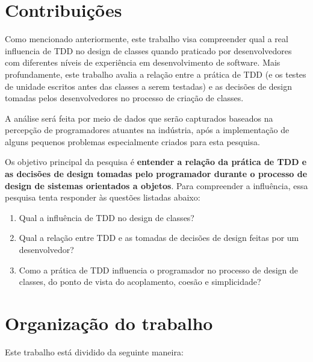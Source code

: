 \section{Contribuições}

Como mencionado anteriormente, este trabalho
visa compreender qual a real influencia de TDD no design de classes quando praticado
por desenvolvedores com diferentes níveis de experiência em desenvolvimento de 
software.
Mais profundamente, este trabalho avalia a relação entre a prática de TDD (e os testes de unidade
escritos antes das classes a serem testadas) e as decisões de design tomadas 
pelos desenvolvedores no processo de criação de classes.

A análise será feita por meio de dados que serão
capturados baseados na percepção de programadores atuantes na indústria, após
a implementação de alguns pequenos problemas especialmente criados para
esta pesquisa.

Os objetivo principal da pesquisa é \textbf{entender a relação da prática de TDD 
e as decisões de design tomadas pelo programador durante o processo de design de sistemas orientados a objetos}.
Para compreender a influência, essa pesquisa tenta responder às questões listadas
abaixo:

\begin{enumerate}

	\item Qual a influência de TDD no design de classes?

	\item Qual a relação entre TDD e as tomadas de decisões de design
	feitas por um desenvolvedor?

	\item Como a prática de TDD influencia o programador no processo de  
	design de classes, do ponto de vista do acoplamento, coesão e simplicidade?

\end{enumerate}

\section{Organização do trabalho}

Este trabalho está dividido da seguinte maneira: 

